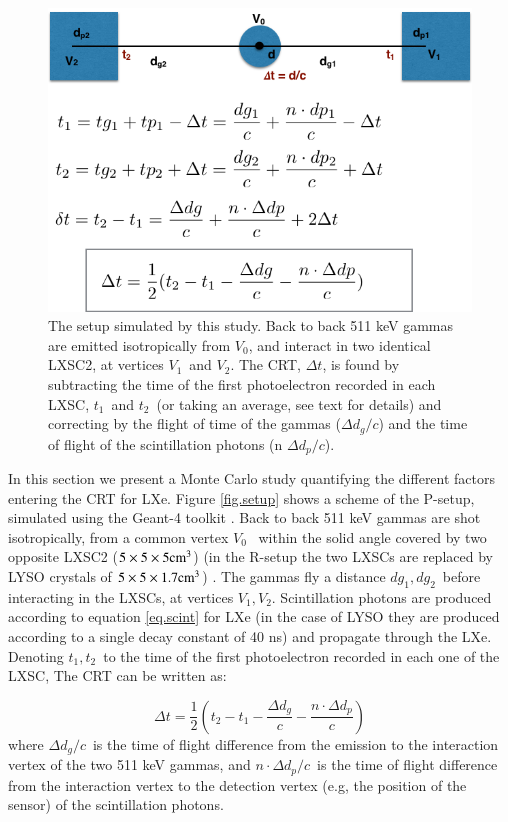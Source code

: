 \documentclass[review]{elsarticle}
\begin{document}
\begin{figure}[!bhtp]
	\centering
	\includegraphics[scale=3]{../img/TOFSetup.png}
	\caption{\label{fig.scint} The setup simulated by this study. Back to back 511 keV gammas are emitted
	isotropically from $V_0$, and interact in two identical LXSC2, at vertices $V_1$~and
	$V_2$. The CRT, $\Delta t$, is found by subtracting the time of the first photoelectron recorded
	in each LXSC, $t_1$~and $t_2$~(or taking an average, see text for details) and correcting
	by the flight of time of the gammas ($\Delta d_g/c$) and the time of flight of the scintillation photons
	(n \cdot $\Delta d_p/c$). }
\end{figure}  

In this section we present a Monte Carlo study quantifying the different factors entering the CRT for LXe. Figure \ref{fig.setup} shows a scheme of  the P-setup, simulated using the Geant-4 toolkit \cite{Agostinelli:2002hh} . Back to back 511 keV gammas are shot isotropically, from a common vertex $V_0$~ within the solid angle covered by two opposite LXSC2 ($5 \times 5 \times 5 {\rm cm^3}$) (in the R-setup the two LXSCs are replaced by LYSO crystals of $5 \times 5 \times 1.7 {\rm cm^3}$) . The gammas fly a distance $dg_1, dg_2$~before interacting in the LXSCs, at vertices $V_1, V_2$. Scintillation photons are produced according to equation \ref{eq.scint} for LXe (in the case of LYSO they are produced according to a single decay constant of 40 ns) and propagate through the LXe. Denoting $t_1,t_2$~to the time of the first photoelectron recorded in each one of the LXSC, The CRT can be written as:

\begin{equation}
\Delta t = \frac{1}{2}(t_2 - t_1 - \frac{\Delta d_g}{c} - \frac{n \cdot \Delta d_p}{c}) 
\label{eq.CRT}
\end{equation}
%
where $\Delta d_g/c$~is the time of flight difference from the emission to the interaction vertex of the two 511 keV gammas, and $n \cdot \Delta d_p/c$~is the time of flight difference from the interaction vertex to the
detection vertex (e.g, the position of the sensor) of the scintillation photons. 
\end{document}
